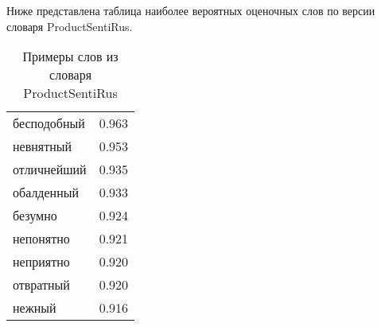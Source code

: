 Ниже представлена таблица наиболее вероятных оценочных слов по версии словаря ProductSentiRus.
\begin{table}[H]
	\caption{Примеры слов из словаря ProductSentiRus}
	\centering
	\renewcommand{\arraystretch}{1.6}
	\begin{tabular}{ll}
		бесподобный & 0.963 \\
		невнятный & 0.953 \\
		отличнейший & 0.935 \\
		обалденный & 0.933 \\
		безумно & 0.924 \\
		непонятно & 0.921 \\
		неприятно & 0.920 \\
		отвратный & 0.920 \\
		нежный & 0.916
	\end{tabular}
	\label{psrus}
\end{table}

